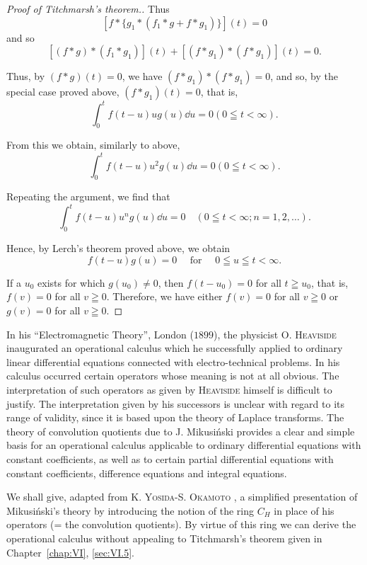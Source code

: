 \begin{proof}[Proof of Titchmarsh's theorem.]
Thus 
\[
[ f * \{g _{1} * (f _{1} * g + f * g _{1}) \} ] (t) = 0
\]
and so 
\[
[ (f * g) * (f _{1} * g _{1}) ] (t) + [ (f * g _{1}) * (f * g _{1}) ] (t) = 0.
\]

Thus, by $(f*g)(t) = 0$, we have $(f*g_1)* (f*g_1) = 0$, and so, by the special case proved above, $(f*g_1)(t) = 0$, that is, 
\[
\int_{0} ^{t} f (t - u) u g (u) \dd u = 0 (0 \leqq t < \infty).
\]

From this we obtain, similarly to above, 
\[
\int_{0} ^{t} f (t - u) u ^{2} g (u) \dd u = 0 (0 \leqq t < \infty).
\]

Repeating the argument, we find that 
\[
\int_{0} ^{t} f (t - u) u ^{n} g (u) \dd u = 0 \quad (0 \leqq t < \infty ; n = 1, 2, \dots).
\]

Hence, by Lerch's theorem proved above, we obtain 
\[
f (t - u) g (u) = 0 \quad \text{ for } \quad 0 \leqq u \leqq t < \infty .
\]

If a $u_0$ exists for which $g(u_0) \neq 0$, then $f(t - u_0) = 0$ for all $t \geqq u_0$, that is, $f(v) = 0$ for all $v \geqq 0$. Therefore, we have either $f(v) = 0$ for all $v \geqq 0$ or $g(v) = 0$ for all $v \geqq 0$. 
\end{proof}

\label{sec:VI.6}

In his ``Electromagnetic Theory'', London ($1899$), the physicist O. \textsc{Heaviside} inaugurated an operational calculus which he successfully applied to ordinary linear differential equations connected with electro-technical problems. In his calculus occurred certain operators whose meaning is not at all obvious. The interpretation of such operators as given by \textsc{Heaviside} himself is difficult to justify. The interpretation given by his successors is unclear with regard to its range of validity, since it is based upon the theory of Laplace transforms. The theory of convolution quotients due to J. Mikusiński provides a clear and simple basis for an operational calculus applicable to ordinary differential equations with constant coefficients, as well as to certain partial differential equations with constant coefficients, difference equations and integral equations. 

We shall give, adapted from K. \textsc{Yosida}-S. \textsc{Okamoto} \cite{yosida383}, a simplified presentation of Mikusiński's theory by introducing the notion of the ring $C_{H}$ in place of his operators (= the convolution quotients). By virtue of this ring we can derive the operational calculus without appealing to Titchmarsh's theorem given in Chapter~\ref{chap:VI}, \ref{sec:VI.5}. 

